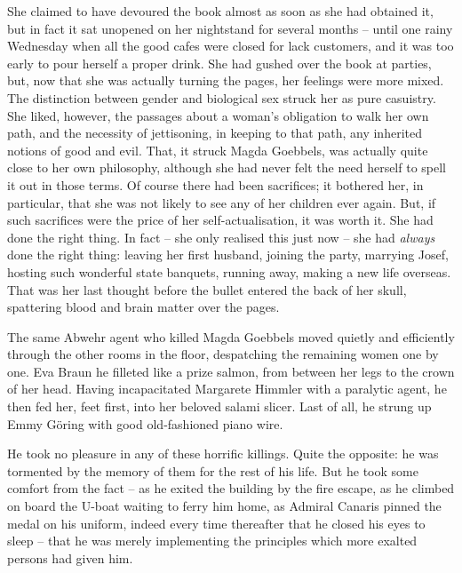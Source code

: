 She claimed to have devoured the book almost as soon as she had obtained it, but in fact it sat unopened on her nightstand for several months -- until one rainy Wednesday when all the good cafes were closed for lack customers, and it was too early to pour herself a proper drink. She had gushed over the book at parties, but, now that she was actually turning the pages, her feelings were more mixed. The distinction between gender and biological sex struck her as pure casuistry. She liked, however, the passages about a woman's obligation to walk her own path, and the necessity of jettisoning, in keeping to that path, any inherited notions of good and evil. That, it struck Magda Goebbels, was actually quite close to her own philosophy, although she had never felt the need herself to spell it out in those terms. Of course there had been sacrifices; it bothered her, in particular, that she was not likely to see any of her children ever again. But, if such sacrifices were the price of her self-actualisation, it was worth it. She had done the right thing. In fact -- she only realised this just now -- she had \emph{always} done the right thing: leaving her first husband, joining the party, marrying Josef, hosting such wonderful state banquets, running away, making a new life overseas. That was her last thought before the bullet entered the back of her skull, spattering blood and brain matter over the pages.

The same Abwehr agent who killed Magda Goebbels moved quietly and efficiently through the other rooms in the floor, despatching the remaining women one by one. Eva Braun he filleted like a prize salmon, from between her legs to the crown of her head. Having incapacitated Margarete Himmler with a paralytic agent, he then fed her, feet first, into her beloved salami slicer. Last of all, he strung up Emmy G\"oring with good old-fashioned piano wire.

He took no pleasure in any of these horrific killings. Quite the opposite: he was tormented by the memory of them for the rest of his life. But he took some comfort from the fact -- as he exited the building by the fire escape, as he climbed on board the U-boat waiting to ferry him home, as Admiral Canaris pinned the medal on his uniform, indeed every time thereafter that he closed his eyes to sleep -- that he was merely implementing the principles which more exalted persons had given him.
